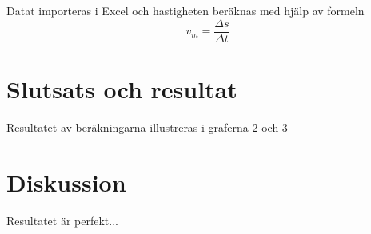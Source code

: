 \documentclass[11p, titlepage, oneside, a4paper]{article}
\begin{document}
    Datat importeras i Excel och hastigheten beräknas med hjälp av formeln
    \begin{equation}
        v_m = \frac{\Delta s}{\Delta t}
    \end{equation}
    
    \section{Slutsats och resultat} 
        Resultatet av beräkningarna illustreras i graferna 2 och 3
    \section{Diskussion} 
    Resultatet är perfekt...

    
    \printbibliography
\end{document}
